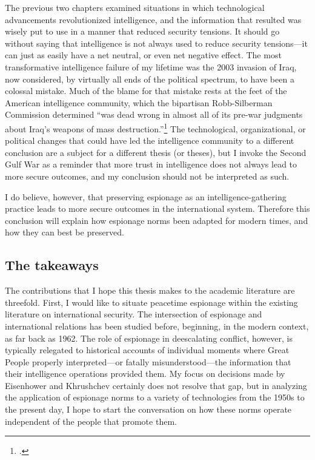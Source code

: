 \documentclass{report}
\begin{document}
The previous two chapters examined situations in which technological advancements revolutionized intelligence, and the information that resulted was wisely put to use in a manner that reduced security tensions. It should go without saying that intelligence is not always used to reduce security tensions---it can just as easily have a net neutral, or even net negative effect. The most transformative intelligence failure of my lifetime was the 2003 invasion of Iraq, now considered, by virtually all ends of the political spectrum, to have been a colossal mistake. Much of the blame for that mistake rests at the feet of the American intelligence community, which the bipartisan Robb-Silberman Commission determined ``was dead wrong in almost all of its pre-war judgments about Iraq's weapons of mass destruction.''\footcite{commission_on_the_intelligence_capabilities_of_the_united_states_regarding_wmds_final_2005} The technological, organizational, or political changes that could have led the intelligence community to a different conclusion are a subject for a different thesis (or theses), but I invoke the Second Gulf War as a reminder that more trust in intelligence does not always lead to more secure outcomes, and my conclusion should not be interpreted as such.

I do believe, however, that preserving espionage as an intelligence-gathering practice leads to more secure outcomes in the international system. Therefore this conclusion will explain how espionage norms been adapted for modern times, and how they can best be preserved.


\subsection{The takeaways}
The contributions that I hope this thesis makes to the academic literature are threefold. First, I would like to situate peacetime espionage within the existing literature on international security. The intersection of espionage and international relations has been studied before, beginning, in the modern context, as far back as 1962. The role of espionage in deescalating conflict, however, is typically relegated to historical accounts of individual moments where Great People properly interpreted---or fatally misunderstood---the information that their intelligence operations provided them. My focus on decisions made by Eisenhower and Khrushchev certainly does not resolve that gap, but in analyzing the application of espionage norms to a variety of technologies from the 1950s to the present day, I hope to start the conversation on how these norms operate independent of the people that promote them.
\end{document}
